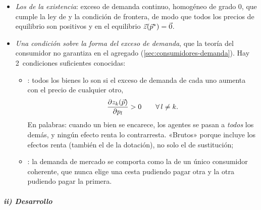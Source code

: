 \documentclass[11pt]{article}
\begin{document}
\begin{itemize}
\item \emph{Los de la existencia}: exceso de demanda continuo, homogéneo de grado 0, que cumple la ley de  y la condición de frontera, de modo que todos los precios de equilibrio son positivos y en el equilibrio $\vec{z}(\vec{p}^*)=\vec{0}$.
\item \emph{Una condición sobre la forma del exceso de demanda}, que la teoría del consumidor no garantiza en el agregado (\ref{sec:consumidores-demanda}). Hay 2~condiciones suficientes conocidas:
  \begin{itemize}
  \item {}: todos los bienes lo son si el exceso de demanda de cada uno aumenta con el precio de cualquier otro,
    \begin{equation}
    \frac{\partial z_k(\vec{p})}{\partial p_l}>0\qquad\forall\,l\neq k. \label{eq:sustitutivos-brutos}
    \end{equation}
    En palabras: cuando un bien se encarece, los agentes se pasan a \emph{todos} los demás, y ningún efecto renta lo contrarresta. «Brutos» porque incluye los efectos renta (también el de la dotación), no solo el de sustitución;
  \item {}: la demanda de mercado se comporta como la de un único consumidor coherente, que nunca elige una cesta pudiendo pagar otra y la otra pudiendo pagar la primera.
  \end{itemize}
\end{itemize}

\subparagraph{ii) Desarrollo}
\end{document}
